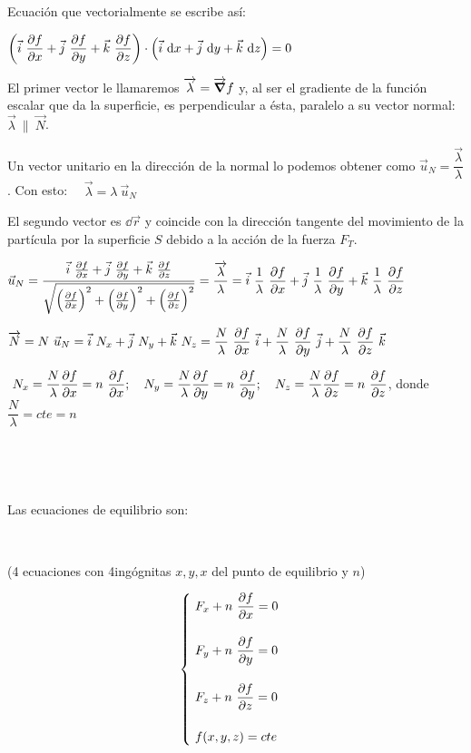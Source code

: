Ecuación que vectorialmente se escribe así:

$\displaystyle \left( \vec i \ \pdv{f}{x} + \vec j \ \pdv{f}{y} +\vec k \ \pdv{f}{z} \right) \cdot \left( \vec i \ \dd x+ \vec j \ \dd y + \vec k \ \dd z \right)=0$


El primer vector le llamaremos $\overrightarrow{\lambda}=\overrightarrow{\grad}f$ y, al ser el gradiente de la función escalar que da la superficie, es perpendicular a ésta, paralelo a su vector normal: $\overrightarrow{\lambda}\ \parallel \ \overrightarrow{N}$. 

Un vector unitario en la dirección de la normal lo podemos obtener como $\vec u_N=\dfrac{\overrightarrow{\lambda}}{\lambda}$. Con esto: $\quad \overrightarrow{\lambda}=\lambda \ \vec u_N$

El segundo vector es $\dd \vec r$ y coincide con la dirección tangente del movimiento de la partícula por la superficie $S$ debido a la acción de la fuerza $F_T$.

$\vec u_N=\displaystyle \dfrac { \vec i \ \pdv{f}{x} + \vec j \ \pdv{f}{y} +\vec k \ \pdv{f}{z} }{\sqrt{ \left(\pdv{f}{x} \right)^2 + \left(\pdv{f}{y} \right)^2 + \left(\pdv{f}{z} \right)^2 }} =  \dfrac{\overrightarrow{\lambda}}{\lambda}= \vec i \ \dfrac 1 \lambda \ \pdv{f}{x} + \vec j \ \dfrac 1 \lambda \ \pdv{f}{y} +\vec k \ \dfrac 1 \lambda \ \pdv{f}{z}$


$\displaystyle \overrightarrow{N}=N\ \vec u_N=\vec i \ N_x+\vec j \ N_y+\vec k \ N_z= \dfrac N \lambda \ \pdv{f}{x} \ \vec i +  \dfrac N \lambda \ \pdv{f}{y} \ \vec j + \dfrac N \lambda \ \pdv{f}{z} \ \vec k$

$\ \displaystyle N_x=\dfrac N \lambda \pdv{f}{x} = n\ \pdv{f}{x}; \quad \displaystyle N_y=\dfrac N \lambda \pdv{f}{y} = n\ \pdv{f}{y}; \quad \displaystyle N_z=\dfrac N \lambda \pdv{f}{z} = n\ \pdv{f}{z}$, donde $\dfrac N \lambda = cte = n$

\vspace{30mm} %

\begin{multicols}{2}
$\quad$

$\quad$

Las ecuaciones de equilibrio son: 

$\quad$

(4 ecuaciones con 4ingógnitas $x,y,x$ del punto de equilibrio y $n$)

$$\displaystyle
\begin{cases}
\displaystyle \ F_x+n\ \pdv{f}{x}=0 \\ \\ \displaystyle \ F_y+n\ \pdv{f}{y}=0 \\  \\ \displaystyle \ F_z+n\ \pdv{f}{z}=0 \\ \\ \ f(x,y,z)=cte
\end{cases}$$
\end{multicols}


